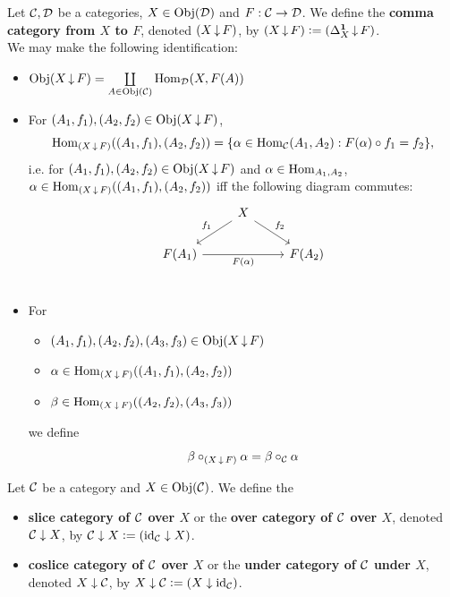 \documentclass{book}
\begin{document}
	\begin{defn} 
		Let $\mathcal{C}, \mathcal{D}$ be a categories, $X \in \operatorname{Obj}(\mathcal{D})$ and $F: \mathcal{C} \rightarrow \mathcal{D}$. We define the \textbf{comma category from $X$ to $F$}, denoted $(X \operatorname{\downarrow} F)$, by $(X \operatorname{\downarrow} F) \vcentcolon= (\Delta^{\mathbf{1}}_X \operatorname{\downarrow} F)$. \\
		We may make the following identification:
		\begin{itemize}
			\item $\operatorname{Obj}(X \operatorname{\downarrow} F) =  \coprod\limits_{A \in \operatorname{Obj}(\mathcal{C})} \operatorname{Hom}_{\mathcal{D}}(X, F(A))$ 
			\item For $(A_1, f_1), (A_2, f_2) \in \operatorname{Obj}(X \operatorname{\downarrow} F)$, 
			$$\operatorname{Hom}_{(X \operatorname{\downarrow} F)}((A_1, f_1), (A_2, f_2)) = \{\alpha \in \operatorname{Hom}_{\mathcal{C}}(A_1, A_2): F(\alpha) \circ f_1 = f_2 \},$$
			i.e. for $(A_1, f_1), (A_2, f_2) \in \operatorname{Obj}(X \operatorname{\downarrow} F)$ and $\alpha \in \operatorname{Hom}_{A_1, A_2}$, $\alpha \in \operatorname{Hom}_{(X \operatorname{\downarrow} F)}((A_1, f_1), (A_2, f_2))$ iff the following diagram commutes:
			\[ 
			\begin{tikzcd}
				&  X \arrow[dl, "f_1"']  \arrow[dr, "f_2"] & \\
				F(A_1)  \arrow[rr, "F(\al)"'] &&  F(A_2) \\ 
			\end{tikzcd}
			\]
			\item For 
			\begin{itemize}
				\item $(A_1, f_1), (A_2, f_2), (A_3, f_3) \in \operatorname{Obj}(X \operatorname{\downarrow} F)$
				\item $\alpha \in \operatorname{Hom}_{(X \operatorname{\downarrow} F)}((A_1, f_1), (A_2, f_2))$
				\item $\beta \in \operatorname{Hom}_{(X \operatorname{\downarrow} F)}((A_2, f_2), (A_3, f_3))$
			\end{itemize}
			we define 
			$$\beta \circ_{(X \operatorname{\downarrow} F)} \alpha = \beta \circ_{\mathcal{C}} \alpha $$
		\end{itemize}
	\end{defn}
	
	\begin{defn} 
		Let $\mathcal{C}$ be a category and $X \in \operatorname{Obj}(\mathcal{C})$. We define the 
		\begin{itemize}
			\item \textbf{slice category of $\mathcal{C}$ over $X$} or the \textbf{over category of $\mathcal{C}$ over $X$}, denoted $\mathcal{C} \downarrow X$, by $\mathcal{C} \downarrow X \vcentcolon= (\operatorname{id}_{\mathcal{C}} \downarrow X)$.
			\item \textbf{coslice category of $\mathcal{C}$ over $X$} or the \textbf{under category of $\mathcal{C}$ under $X$}, denoted $X \downarrow \mathcal{C}$, by $X \downarrow \mathcal{C} \vcentcolon= (X \downarrow \operatorname{id}_{\mathcal{C}})$.
		\end{itemize}
	\end{defn}
\end{document}
